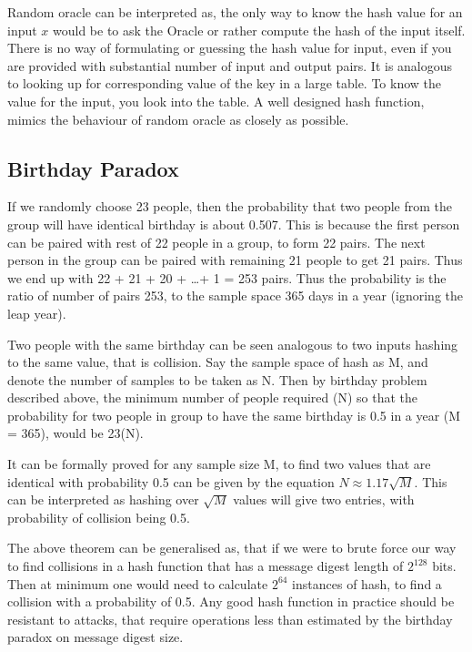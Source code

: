   Random oracle can be interpreted as, the only way to know the hash value for an input $x$ would be to
  ask the Oracle or rather compute the hash of the input itself. There is no way of formulating or 
  guessing the hash value for input, even if you are provided with substantial number of input and output
  pairs. It is analogous to looking up for corresponding value of the key in a large table. To know the
  value for the input, you look into the table. A well designed hash function, mimics the behaviour of
  random oracle as closely as possible. 

  \subsection{ Birthday Paradox }
  If we randomly choose 23 people, then the probability that two people from the group will have identical
  birthday is about 0.507. This is because the first person can be paired with rest of 22 people in a group,
  to form 22 pairs. The next person in the group can be paired with remaining 21 people to get 21 pairs. Thus 
  we end up with 22 + 21 + 20 + \ldots + 1 = 253 pairs. Thus the probability is the ratio of number of pairs 253,
  to the sample space 365 days in a year (ignoring the leap year).

  Two people with the same birthday can be seen analogous to two inputs hashing to the same value, that is 
  collision. Say the sample space of hash as M, and denote the number of samples to be taken as N. Then 
  by birthday problem described above, the minimum number of people required (N) so that the probability for
  two people in group to have the same birthday is 0.5 in a year (M = 365), would be 23(N).

  It can be formally proved for any sample size M, to find two values that are identical with probability
  0.5 can be given by the equation $N \approx 1.17 \sqrt{M}$. This can be interpreted as hashing over $\sqrt{M}$
  values will give two entries, with probability of collision being 0.5.

  The above theorem can be generalised as, that if we were to brute force our way to find collisions in
  a hash function that has a message digest length of $2^{128}$ bits. Then at minimum one would need to 
  calculate $2^{64}$ instances of hash, to find a collision with a probability of 0.5. Any good hash function 
  in practice should be resistant to attacks, that require operations less than estimated by the birthday 
  paradox on message digest size.


